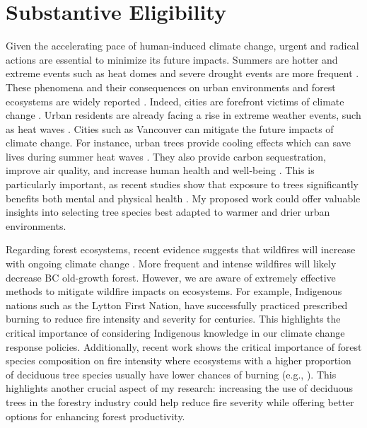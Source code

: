 \documentclass[11pt,letter]{article}
\begin{document}
\section *{Substantive Eligibility} 
Given the accelerating pace of human-induced climate change, urgent and radical actions are essential to minimize its future impacts. Summers are hotter and extreme events such as heat domes and severe drought events are more frequent \citep{zhang_increased_2023}. These phenomena and their consequences on urban environments and forest ecosystems are widely reported \citep{allen_global_2010, mccarthy_climate_2010}. Indeed, cities are forefront victims of climate change \citep{das_unraveling_2024, corburn_cities_2009}. Urban residents are already facing a rise in extreme weather events, such as heat waves \citep{das_unraveling_2024}. Cities such as Vancouver can mitigate the future impacts of climate change. For instance, urban trees provide cooling effects which can save lives during summer heat waves \citep{ettinger_street_2024, zandler_cooling_2024}. They also provide carbon sequestration, improve air quality, and increase human health and well-being \citep{wolf_urban_2020}. This is particularly important, as recent studies show that exposure to trees significantly benefits both mental and physical health  \citep{wolf_urban_2020, turnerskoff_benefits_2019}. My proposed work could offer valuable insights into selecting tree species best adapted to warmer and drier urban environments.

Regarding forest ecosystems, recent evidence suggests that wildfires will increase with ongoing climate change \citep{wasserman_climate_2023}. More frequent and intense wildfires will likely decrease BC old-growth forest. \citep{price_conflicting_2021} However, we are aware of extremely effective methods to mitigate wildfire impacts on ecosystems. For example, Indigenous nations such as the Lytton First Nation, have successfully practiced prescribed burning to reduce fire intensity and severity for centuries. \citep{lewis_return_2018} This highlights the critical importance of considering Indigenous knowledge in our climate change response policies. Additionally, recent work shows the critical importance of forest species composition on fire intensity where ecosystems with a higher proportion of deciduous tree species usually have lower chances of burning (e.g., \citep{park_impact_2024}). This highlights another crucial aspect of my research: increasing the use of deciduous trees in the forestry industry could help reduce fire severity while offering better options for enhancing forest productivity.
\end{document}
